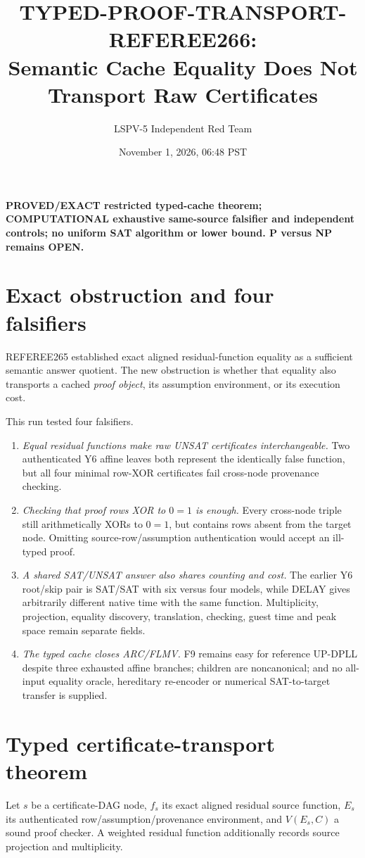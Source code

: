 \documentclass[11pt]{article}
\title{TYPED-PROOF-TRANSPORT-REFEREE266:\\Semantic Cache Equality Does Not Transport Raw Certificates}
\author{LSPV-5 Independent Red Team}
\date{November 1, 2026, 06:48 PST}
\begin{document}
\maketitle

\noindent\textbf{PROVED/EXACT restricted typed-cache theorem; COMPUTATIONAL exhaustive same-source falsifier and independent controls; no uniform SAT algorithm or lower bound. P versus NP remains OPEN.}

\section{Exact obstruction and four falsifiers}
REFEREE265 established exact aligned residual-function equality as a sufficient semantic answer quotient.  The new obstruction is whether that equality also transports a cached \emph{proof object}, its assumption environment, or its execution cost.

This run tested four falsifiers.
\begin{enumerate}
\item \emph{Equal residual functions make raw UNSAT certificates interchangeable.}  Two authenticated Y6 affine leaves both represent the identically false function, but all four minimal row-XOR certificates fail cross-node provenance checking.
\item \emph{Checking that proof rows XOR to $0=1$ is enough.}  Every cross-node triple still arithmetically XORs to $0=1$, but contains rows absent from the target node.  Omitting source-row/assumption authentication would accept an ill-typed proof.
\item \emph{A shared SAT/UNSAT answer also shares counting and cost.}  The earlier Y6 root/skip pair is SAT/SAT with six versus four models, while DELAY gives arbitrarily different native time with the same function.  Multiplicity, projection, equality discovery, translation, checking, guest time and peak space remain separate fields.
\item \emph{The typed cache closes ARC/FLMV.}  F9 remains easy for reference UP-DPLL despite three exhausted affine branches; children are noncanonical; and no all-input equality oracle, hereditary re-encoder or numerical SAT-to-target transfer is supplied.
\end{enumerate}

\section{Typed certificate-transport theorem}
Let $s$ be a certificate-DAG node, $f_s$ its exact aligned residual source function, $E_s$ its authenticated row/assumption/provenance environment, and $V(E_s,C)$ a sound proof checker.  A weighted residual function additionally records source projection and multiplicity.
\end{document}

